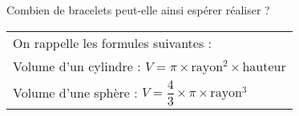 Combien de bracelets peut-elle ainsi espérer réaliser ?
 
\begin{center}
\begin{tabularx}{0.75\linewidth}{|X|}\hline
On rappelle les formules suivantes :\\ 
Volume d'un cylindre : $V = \pi \times \text{rayon}^2 \times \text{hauteur}$\\ 
Volume d'une sphère : $V = \dfrac{4}{3}\times  \pi \times \text{rayon}^3$\\ \hline
\end{tabularx}
\end{center}  

